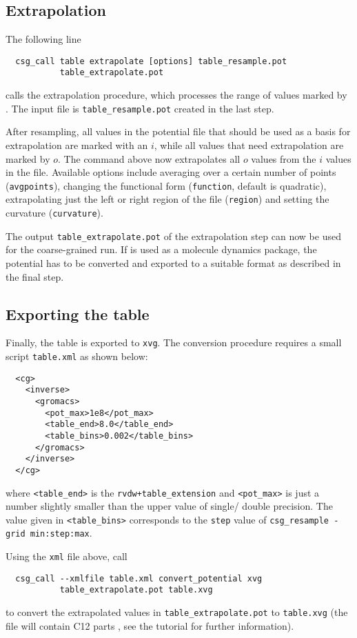 \subsection*{Extrapolation}
The following line
\begin{verbatim}
  csg_call table extrapolate [options] table_resample.pot
           table_extrapolate.pot
\end{verbatim}
calls the extrapolation procedure, which processes the range of values marked by . The input file is \texttt{table\_resample.pot} created in the last step.

After resampling, all values in the potential file that should be used as a basis for extrapolation are marked with an $i$, while all values that need extrapolation are marked by $o$. The command above now extrapolates all $o$ values from the $i$ values in the file. Available options include averaging over a certain number of points (\texttt{avgpoints}), changing the functional form (\texttt{function}, default is quadratic), extrapolating just the left or right region of the file (\texttt{region}) and setting the curvature (\texttt{curvature}).

The output \texttt{table\_extrapolate.pot} of the extrapolation step can now be used for the coarse-grained run. If \gromacs is used as a molecule dynamics package, the potential has to be converted and exported to a suitable \gromacs format as described in the final step.

\subsection*{Exporting the table}
Finally, the table is exported to \texttt{xvg}. The conversion procedure requires a small script \texttt{table.xml} as shown below:
\begin{verbatim}
  <cg>
    <inverse>
      <gromacs>
        <pot_max>1e8</pot_max>
        <table_end>8.0</table_end>
        <table_bins>0.002</table_bins>
      </gromacs>
    </inverse>
  </cg>
\end{verbatim}
where \texttt{<table\_end>} is the \gromacs \texttt{rvdw+table\_extension} and \texttt{<pot\_max>} is just a number slightly smaller than the upper value of single/ double precision. The value given in \texttt{<table\_bins>} corresponds to the \texttt{step} value of \texttt{csg\_resample -grid min:step:max}.

Using the \texttt{xml} file above, call
\begin{verbatim}
  csg_call --xmlfile table.xml convert_potential xvg
           table_extrapolate.pot table.xvg
\end{verbatim}
to convert the extrapolated values in \texttt{table\_extrapolate.pot} to \texttt{table.xvg} (the file will contain \gromacs C12 parts \todo, see the \gromacs tutorial for further information).

